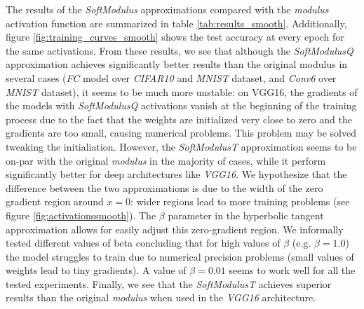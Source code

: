 \documentclass[authoryear]{elsarticle}
\begin{document}
The results of the \textit{SoftModulus} approximations compared with the \textit{modulus} activation function are summarized in table \ref{tab:results_smooth}. Additionally, figure \ref{fig:training_curves_smooth} shows the test accuracy at every epoch for the same activations. From these results, we see that although the \textit{SoftModulusQ} approximation achieves significantly better results than the original modulus in several cases (\textit{FC} model over \textit{CIFAR10} and \textit{MNIST} dataset, and \textit{Conv6} over \textit{MNIST} dataset), it seems to be much more unstable: on VGG16, the gradients of the models with \textit{SoftModulusQ} activations vanish at the beginning of the training process due to the fact that the weights are initialized very close to zero and the gradients are too small, causing numerical problems. This problem may be solved tweaking the initialiation. However, the \textit{SoftModulusT} approximation seems to be on-par with the original \textit{modulus} in the majority of cases, while it perform significantly better for deep architectures like \textit{VGG16}. We hypothesize that the difference between the two approximations is due to the width of the zero gradient region around $x=0$: wider regions lead to more training problems (see figure \ref{fig:activationssmooth}). The $\beta$ parameter in the hyperbolic tangent approximation allows for easily adjust this zero-gradient region. We informally tested different values of beta concluding that for high values of $\beta$ (e.g. $\beta=1.0$) the model struggles to train due to numerical precision problems (small values of weights lead to tiny gradients). A value of $\beta=0.01$ seems to work well for all the tested experiments. Finally, we see that the \textit{SoftModulusT} achieves superior results than the original \textit{modulus} when used in the \textit{VGG16} architecture.
\end{document}
